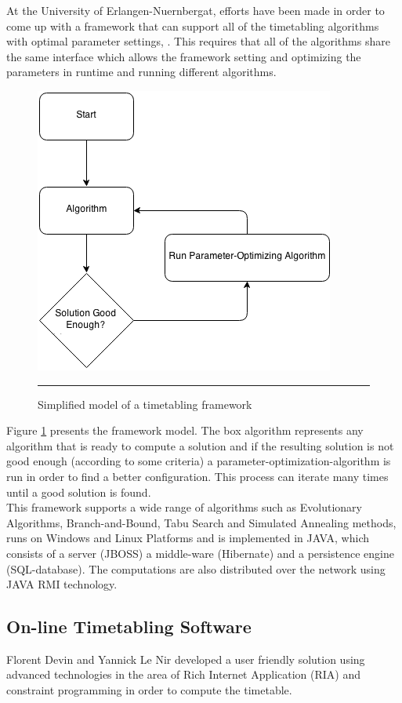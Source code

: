 At the University of Erlangen-Nuernbergat, efforts have been made in order to come up with a framework that can support all of the timetabling algorithms with optimal parameter settings, \citep{distributed_timetabling}. This requires that all of the algorithms share the same interface which allows the framework setting and optimizing the parameters in runtime and running different algorithms. 

\begin{figure}[htbp]
	\centering
		\includegraphics[scale=0.55]{./Figures/distributed_timetabling.png}
		\rule{35em}{0.5pt}
	\caption[Simplified model of a distributed timetabling for timetabling]{Simplified model of a timetabling framework}
	\label{fig:distributed_timetabling}
\end{figure}

Figure \ref{fig:distributed_timetabling} presents the framework model. The box algorithm represents any algorithm that is ready to compute a solution and if the resulting solution is not good enough (according to some criteria) a parameter-optimization-algorithm is run in order to find a better configuration. This process can iterate many times until a good solution is found.\\
This framework supports a wide range of algorithms such as Evolutionary Algorithms, Branch-and-Bound, Tabu Search and Simulated Annealing methods, runs on Windows and Linux Platforms and is implemented in JAVA, which consists of a server (JBOSS) a middle-ware (Hibernate) and a persistence engine (SQL-database). The computations are also distributed over the network using JAVA RMI technology.

\subsection{On-line Timetabling Software}
Florent Devin and Yannick Le Nir \citep{online_tt_patat2010} developed a user friendly solution using advanced technologies in the area of Rich Internet Application (RIA) and constraint programming in order to compute the timetable.



